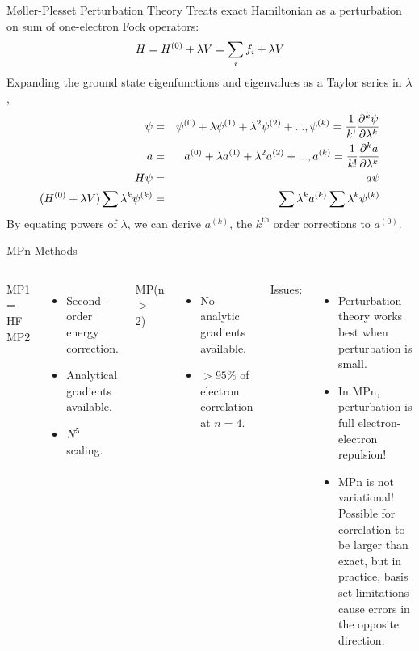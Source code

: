 \documentclass[aspectratio=169]{beamer}
\begin{document}
\begin{frame}{M{\o}ller-Plesset Perturbation Theory}
    Treats exact Hamiltonian as a perturbation on sum of one-electron Fock operators:
    \begin{equation*}
    \footnotesize
        H = H^{(0)}+ \lambda V = \sum_i f_i + \lambda V
    \end{equation*}
Expanding the ground state eigenfunctions and eigenvalues as a Taylor series in $\lambda$,
\begin{eqnarray*}
\footnotesize
\psi & = & \psi^{(0)} + \lambda \psi^{(1)} + \lambda^2 \psi^{(2)} + ..., \psi^{(k)} = \frac{1}{k!}\frac{\partial^k \psi}{\partial \lambda^k}\\
a & = & a^{(0)} + \lambda a^{(1)} + \lambda^2 a^{(2)} + ..., a^{(k)} = \frac{1}{k!}\frac{\partial^k a}{\partial \lambda^k}\\
H\psi & = & a\psi\\
(H^{(0)}+ \lambda V)\sum \lambda^k\psi^{(k)} & = & \sum \lambda^k a^{(k)}\sum \lambda^k\psi^{(k)}
\end{eqnarray*}
By equating powers of $\lambda$, we can derive $a^{(k)}$, the $k^{\mbox{th}}$ order corrections to $a^{(0)}$.
\end{frame}

\begin{frame}{MPn Methods}

\begin{columns}
MP1 = HF\newline
\newline
MP2
\begin{itemize}
    \item Second-order energy correction.
    \item Analytical gradients available.
    \item $N^5$ scaling.
\end{itemize}

MP(n $>$ 2)
\begin{itemize}
    \item No analytic gradients available.
    \item $> 95\%$ of electron correlation at $n=4$. 
\end{itemize}

Issues:
\begin{itemize}
    \item Perturbation theory works best when perturbation is small.
    \item In MPn, perturbation is full electron-electron repulsion!
    \item MPn is not variational! Possible for correlation to be larger than exact, but in practice, basis set limitations cause errors in the opposite direction.
\end{itemize}

\end{columns}

\end{frame}
\end{document}
